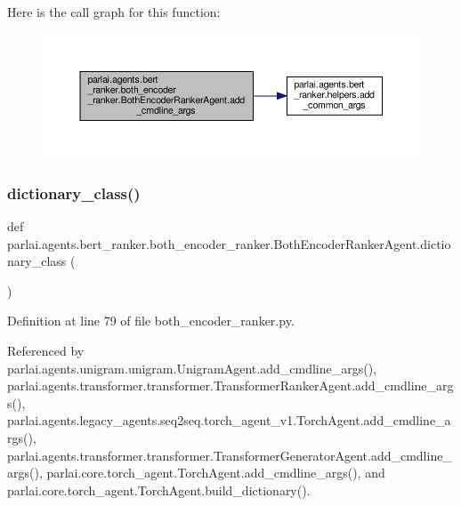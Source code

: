 Here is the call graph for this function\+:
\nopagebreak
\begin{figure}[H]
\begin{center}
\leavevmode
\includegraphics[width=350pt]{classparlai_1_1agents_1_1bert__ranker_1_1both__encoder__ranker_1_1BothEncoderRankerAgent_a763f87c99544b29a0f8fae2c6019e2f8_cgraph}
\end{center}
\end{figure}
\mbox{\label{classparlai_1_1agents_1_1bert__ranker_1_1both__encoder__ranker_1_1BothEncoderRankerAgent_a4fd71b73fc926491aedc3da5921f62ca}} 
\subsubsection{\texorpdfstring{dictionary\+\_\+class()}{dictionary\_class()}}
{\footnotesize\ttfamily def parlai.\+agents.\+bert\+\_\+ranker.\+both\+\_\+encoder\+\_\+ranker.\+Both\+Encoder\+Ranker\+Agent.\+dictionary\+\_\+class (\begin{DoxyParamCaption}{ }\end{DoxyParamCaption})\hspace{0.3cm}{\ttfamily [static]}}



Definition at line 79 of file both\+\_\+encoder\+\_\+ranker.\+py.



Referenced by parlai.\+agents.\+unigram.\+unigram.\+Unigram\+Agent.\+add\+\_\+cmdline\+\_\+args(), parlai.\+agents.\+transformer.\+transformer.\+Transformer\+Ranker\+Agent.\+add\+\_\+cmdline\+\_\+args(), parlai.\+agents.\+legacy\+\_\+agents.\+seq2seq.\+torch\+\_\+agent\+\_\+v1.\+Torch\+Agent.\+add\+\_\+cmdline\+\_\+args(), parlai.\+agents.\+transformer.\+transformer.\+Transformer\+Generator\+Agent.\+add\+\_\+cmdline\+\_\+args(), parlai.\+core.\+torch\+\_\+agent.\+Torch\+Agent.\+add\+\_\+cmdline\+\_\+args(), and parlai.\+core.\+torch\+\_\+agent.\+Torch\+Agent.\+build\+\_\+dictionary().

